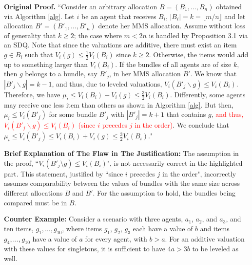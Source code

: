 \documentclass{article}
\theoremstyle{definition}
\begin{document}
\textbf{Original Proof.}
``Consider an arbitrary allocation \( B = (B_1, \ldots, B_n) \) obtained via Algorithm \ref{alg}. Let \( i \) be an agent that receives \( B_i \), \( |B_i| = k = \lfloor m/n \rfloor \) and let allocation \( B' = (B'_1, \ldots, B'_n) \) denote her MMS allocation. Assume without loss of generality that \( k \geq 2 \); the case where \( m < 2n \) is handled by Proposition 3.1 via an SDQ. Note that since the valuations are additive, there must exist an item \( g \in B_i \) such that \( V_i(g) \leq \frac{1}{2}V_i(B_i) \) since \( k \geq 2 \). Otherwise, the items would add up to something larger than \( V_i(B_i) \). If the bundles of all agents are of size \( k \), then \( g \) belongs to a bundle, say \( B'_j \), in her MMS allocation \( B' \). We know that \( |B'_j \backslash g| = k - 1 \), and thus, due to leveled valuations, \( V_i(B'_j \backslash g) \leq V_i(B_i) \). Therefore, we have \( \mu_i \leq V_i(B_i) + V_i(g) \leq \frac{3}{2}V_i(B_i) \). Differently, some agents may receive one less item than others as shown in Algorithm \ref{alg}. But then, \( \mu_i \leq V_i(B'_j) \) for some bundle \( B'_j \) with \( |B'_j| = k + 1 \) that contains \( g \), \textcolor{red} {and thus, \( V_i(B'_j \backslash g ) \leq V_i(B_i) \) (since \( i \) precedes \( j \) in the order)}. We conclude that \( \mu_i \leq V_i(B'_j) \leq V_i(B_i) + V_i(g) \leq \frac{3}{2}V_i(B_i) \)."

\vspace{5mm}

\textbf{Brief Explanation of The Flaw in The Justification:}
The assumption in the proof, ``$V_i(B'_j \setminus g) \leq V_i(B_i)$", is not necessarily correct in the highlighted part. This statement, justified by ``since $i$ precedes $j$ in the order", incorrectly assumes comparability between the values of bundles with the same size across different allocations $B$ and $B'$. For the assumption to hold, the bundles being compared must be in $B$.

\vspace{5mm}

\textbf{Counter Example:}
Consider a scenario with three agents, $a_1$, $a_2$, and $a_3$, and ten items, $g_1, \ldots, g_{10}$, where items $g_1$, $g_2$, $g_3$ each have a value of $b$ and items $g_4, \ldots, g_{10}$ have a value of $a$ for every agent, with $b > a$. For an additive valuation with these values for singletons, it is sufficient to have $4a > 3b$ to be leveled as well.
\end{document}
